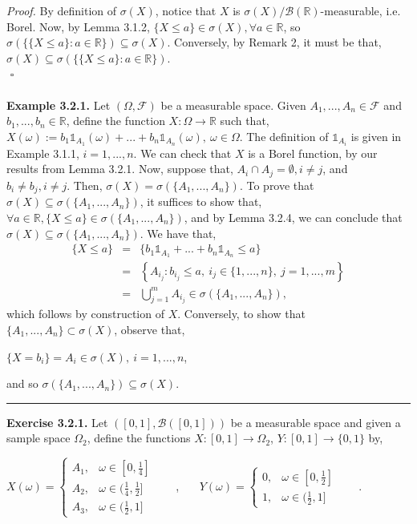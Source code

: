 \documentclass{article}
\begin{document}
\textit{Proof.} By definition of $\sigma(X)$, notice that $X$ is $\sigma(X)/\mathcal{B}(\mathbb{R})$-measurable, i.e. Borel. Now, by Lemma 3.1.2, $\{X \leq a\} \in \sigma(X), \forall a \in \mathbb{R}$, so $\sigma(\{\{X \leq a\}: a \in \mathbb{R}\}) \subseteq \sigma(X)$. Conversely, by Remark 2, it must be that, $\sigma(X) \subseteq \sigma(\{\{X \leq a\}: a \in \mathbb{R}\})$. \\ ${}$ \hfill $\square$ \\\\
\textbf{Example 3.2.1.} Let $(\Omega,\mathcal{F})$ be a measurable space. Given $A_1, ..., A_n \in \mathcal{F}$ and $b_1, ..., b_n \in \mathbb{R}$, define the function $X: \Omega \to \mathbb{R}$ such that, $X(\omega) := b_1 \mathds{1}_{A_1}(\omega) + ... + b_n \mathds{1}_{A_n}(\omega), \ \omega \in \Omega$. The definition of $\mathds{1}_{A_i}$ is given in Example 3.1.1, $i=1,...,n$. We can check that $X$ is a Borel function, by our results from Lemma 3.2.1. Now, suppose that, $A_i \cap A_j = \emptyset, i \neq j$, and $b_i \neq b_j, i \neq j$. Then, $\sigma(X) = \sigma(\{A_1, ..., A_n\})$. To prove that $\sigma(X) \subseteq \sigma(\{A_1, ..., A_n\})$, it suffices to show that, \\ $\forall a \in \mathbb{R}, \{X \leq a\} \in \sigma(\{A_1,...,A_n\})$, and by Lemma 3.2.4, we can conclude that $\sigma(X) \subseteq \sigma(\{A_1, ..., A_n\})$. We have that,
\begin{eqnarray}
\nonumber
\{X \leq a\} &=& \{b_1 \mathds{1}_{A_1} + ... + b_n \mathds{1}_{A_n} \leq a\}\\
\nonumber
&=& \left\{A_{i_j}: b_{i_j} \leq a, \ i_j \in \{1,...,n\}, \ j = 1,...,m\right\}\\
\nonumber
&=& \bigcup_{j=1}^{m}A_{i_{j}} \in \sigma(\{A_1,...,A_n\}),
\end{eqnarray}
which follows by construction of $X$. Conversely, to show that $\{A_1, ..., A_n\} \subset \sigma(X)$, observe that,
\begin{center}
	$\{X = b_i\} = A_i \in \sigma(X), \ i = 1, ..., n$,
\end{center}
and so $\sigma(\{A_1, ..., A_n\}) \subseteq \sigma(X)$.
\begin{center}
	\noindent\rule{12cm}{0.4pt}
\end{center}
\textbf{Exercise 3.2.1.} Let $([0,1], \mathcal{B}([0,1]))$ be a measurable space and given a sample space $\Omega_2$, define the functions $X: [0,1] \to \Omega_2$, $Y: [0,1] \to \{0,1\}$ by,
\begin{center}
$X(\omega) =
\begin{cases}
A_1, & \omega \in [0, \frac{1}{4}]\\
A_2, & \omega \in (\frac{1}{4}, \frac{1}{2}]\\
A_3, & \omega \in (\frac{1}{2},1]
\end{cases}$
\ \ \ , \ \ \
$Y(\omega) = 
\begin{cases}
0, & \omega \in [0,\frac{1}{2}]\\
1, & \omega \in (\frac{1}{2},1]
\end{cases}$ \ \ \ .
\end{center}
\end{document}
